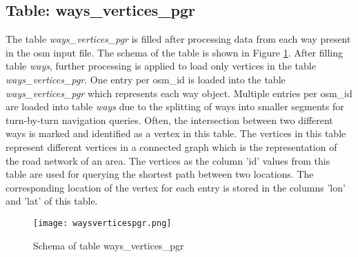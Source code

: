 \subsection{Table: ways{\_}vertices{\_}pgr}
The table \textit{ways{\_}vertices{\_}pgr} is filled after processing data from each way present in the osm input file. The schema of the table is shown in Figure \ref{fg:waysverticespgr}. After filling table \textit{ways}, further processing is applied to load only vertices in the table \textit{ways{\_}vertices{\_}pgr}. One entry per osm{\_}id is loaded into the table \textit{ways{\_}vertices{\_}pgr} which represents each way object. Multiple entries per osm{\_}id are loaded into table \textit{ways} due to the splitting of ways into smaller segments for turn-by-turn navigation queries. Often, the intersection between two different ways is marked and identified as a vertex in this table. The vertices in this table represent different vertices in a connected graph which is the representation of the road network of an area. The vertices as the column 'id' values from this table are used for querying the shortest path between two locations. The corresponding location of the vertex for each entry is stored in the columns 'lon' and 'lat' of this table.
\begin{figure}
\texttt{[image: waysverticespgr.png]}
\caption{Schema of table ways{\_}vertices{\_}pgr}
\label{fg:waysverticespgr}
\end{figure}




